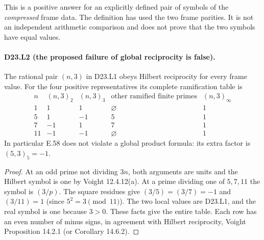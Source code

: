 This is a positive answer for an explicitly defined pair of symbols
of the \emph{compressed} frame data. The definition has used the
two frame parities. It is not an independent arithmetic comparison
and does not prove that the two symbols have equal values.

\paragraph{D23.L2 (the proposed failure of global reciprocity is false).}
The rational pair $(n,3)$ in D23.L1 obeys Hilbert reciprocity for
every frame value. For the four positive representatives its complete
ramification table is
\[
\begin{array}{c|cc|c|c}
n&(n,3)_2&(n,3)_3&\text{other ramified finite primes}&(n,3)_\infty\\\hline
1&1&1&\varnothing&1\\
5&1&-1&5&1\\
7&-1&1&7&1\\
11&-1&-1&\varnothing&1
\end{array}
\tag{D23.L2.1}
\]
In particular E.58 does not violate a global product formula: its
extra factor is $(5,3)_5=-1$.
\begin{proof}
At an odd prime not dividing $3n$, both arguments are units and
the Hilbert symbol is one by Voight 12.4.12(a). At a prime dividing
one of $5,7,11$ the symbol is $(3/p)$. The square residues give
$(3/5)=(3/7)=-1$ and $(3/11)=1$ (since $5^2=3\pmod{11}$).
The two local values are D23.L1, and the real symbol is one
because $3>0$. These facts give the entire table. Each row has
an even number of minus signs, in agreement with Hilbert
reciprocity, Voight Proposition 14.2.1 (or Corollary 14.6.2).
\end{proof}

